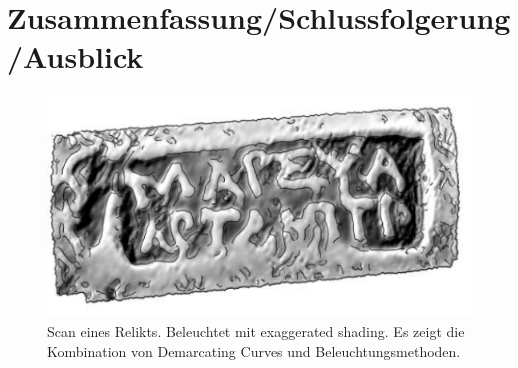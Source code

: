 \documentclass{paperStyle}
\begin{document}
\section{Zusammenfassung/Schlussfolgerung/Ausblick}

\begin{figure}
	\centering
	\includegraphics[width=0.9\linewidth]{shadedDem.png}
	\caption{Scan eines Relikts. Beleuchtet mit exaggerated shading. Es zeigt die Kombination von Demarcating Curves und Beleuchtungsmethoden. \cite{Demarcating}}
	\label{im:shadedDem}
\end{figure}
\end{document}

